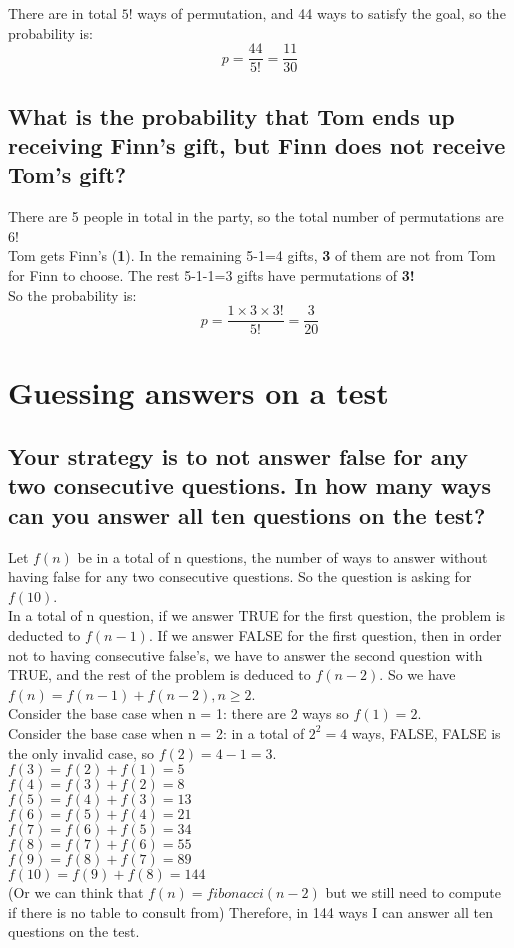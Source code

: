 \documentclass{article}
\begin{document}
There are in total \( 5! \) ways of permutation, and 44 ways to satisfy the goal, so the probability is:
\[
p = \frac{44}{5!} = \frac{11}{30}
\]

\subsection{What is the probability that Tom ends up receiving Finn's gift, but Finn does not receive Tom's gift?}

There are 5 people in total in the party, so the total number of permutations are 6! \\
Tom gets Finn's (\textbf{1}). In the remaining 5-1=4 gifts, \textbf{3} of them are not from Tom for Finn to choose. The rest 5-1-1=3 gifts have permutations of \textbf{3!}\\
So the probability is:
\[
p = \frac{1 \times 3 \times 3! }{5!} = \frac{3}{20}
\]

\section{Guessing answers on a test}

\subsection{Your strategy is to not answer false for any two consecutive questions. In how many ways can you answer all ten questions on the test?}

Let \( f(n) \) be in a total of n questions, the number of ways to answer without having false for any two consecutive questions. So the question is asking for \( f(10) \). \\
In a total of n question, if we answer TRUE for the first question, the problem is deducted to \( f(n-1) \). If we answer FALSE for the first question, then in order not to having consecutive false's, we have to answer the second question with TRUE, and the rest of the problem is deduced to \( f(n-2) \). So we have \( f(n) = f(n-1) + f(n-2), n \geq 2 \). \\
Consider the base case when n = 1: there are 2 ways so \( f(1) = 2 \). \\
Consider the base case when n = 2: in a total of \( 2^2 = 4 \) ways, FALSE, FALSE is the only invalid case, so \( f(2) = 4 - 1 = 3\). \\
\( f(3) = f(2) + f(1) = 5 \) \\ 
\( f(4) = f(3) + f(2) = 8 \) \\ 
\( f(5) = f(4) + f(3) = 13 \) \\ 
\( f(6) = f(5) + f(4) = 21 \) \\ 
\( f(7) = f(6) + f(5) = 34 \) \\ 
\( f(8) = f(7) + f(6) = 55 \) \\ 
\( f(9) = f(8) + f(7) = 89 \) \\ 
\( f(10) = f(9) + f(8) = 144 \) \\
 (Or we can think that \(f(n) = fibonacci(n-2) \) but we still need to compute if there is no table to consult from)
 Therefore, in 144 ways I can answer all ten questions on the test.
\end{document}
